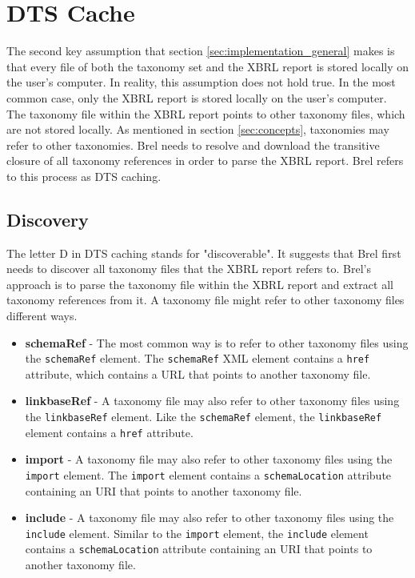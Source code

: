 \section{DTS Cache}
\label{sec:implementation_dts_cache}

The second key assumption that section \ref{sec:implementation_general} makes is that 
every file of both the taxonomy set and the XBRL report is stored locally on the user's computer.
In reality, this assumption does not hold true.
In the most common case, only the XBRL report is stored locally on the user's computer.
The taxonomy file within the XBRL report points to other taxonomy files, which are not stored locally.
As mentioned in section \ref{sec:concepts}, taxonomies may refer to other taxonomies.
Brel needs to resolve and download the transitive closure of all taxonomy references in order to parse the XBRL report.
Brel refers to this process as DTS caching.

\subsection{Discovery}

The letter D in DTS caching stands for "discoverable".
It suggests that Brel first needs to discover all taxonomy files that the XBRL report refers to.
Brel's approach is to parse the taxonomy file within the XBRL report and extract all taxonomy references from it.
A taxonomy file might refer to other taxonomy files different ways.

\begin{itemize}
    \item \textbf{schemaRef} - The most common way is to refer to other taxonomy files using the \texttt{schemaRef} element.
    The \texttt{schemaRef} XML element contains a \texttt{href} attribute, which contains a URL that points to another taxonomy file.
    \item \textbf{linkbaseRef} - A taxonomy file may also refer to other taxonomy files using the \texttt{linkbaseRef} element.
    Like the \texttt{schemaRef} element, the \texttt{linkbaseRef} element contains a \texttt{href} attribute.
    \item \textbf{import} - A taxonomy file may also refer to other taxonomy files using the \texttt{import} element.
    The \texttt{import} element contains a \texttt{schemaLocation} attribute containing an URI that points to another taxonomy file.
    \item \textbf{include} - A taxonomy file may also refer to other taxonomy files using the \texttt{include} element.
    Similar to the \texttt{import} element, the \texttt{include} element contains a \texttt{schemaLocation} attribute containing an URI that points to another taxonomy file.
\end{itemize}

